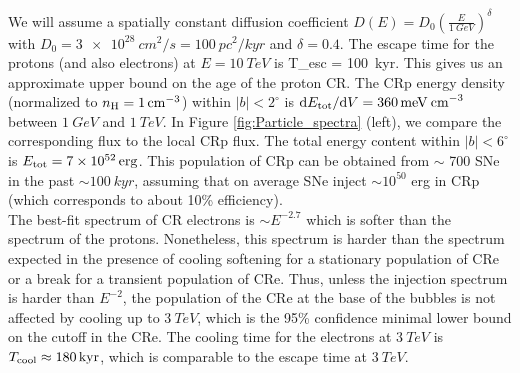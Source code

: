 We will assume a spatially constant diffusion coefficient $D(E) = D_0\left(\frac{E}{\SI{1}{GeV}}\right)^\delta$ with $D_0 = \SI{3e28}{cm^2/s} = \SI{100}{pc^2/kyr}$ and $\delta = 0.4$.
The escape time for the protons (and also electrons) at $E = \SI{10}{TeV}$ is 
\be
T_{\rm esc} =  \approx \SI{100}{kyr}.
\ee
This gives us an approximate upper bound on the age of the proton CR.
The CRp energy density (normalized to $n_{\text{H}} = \SI{1}{cm^{-3}}$) within $|b| < 2^\circ$ is 
$\text{d} E_{\text{tot}} / \text{d} V = \SI{360}{meV\: cm^{-3}}$ between $\SI{1}{GeV}$ and $\SI{1}{TeV}$.
In Figure \ref{fig:Particle_spectra} (left), we compare the corresponding flux to the local CRp flux.
The total energy content within $|b| < 6^\circ$ is $E_{\text{tot}} = \SI{7e52}{erg}$.
This population of CRp can be obtained from $\sim$ 700 SNe in the past $\sim \SI{100}{kyr}$, 
assuming that on average SNe inject $\sim 10^{50}$ erg in CRp (which corresponds to about 10\% efficiency).
\\


The best-fit spectrum of CR electrons is $\sim E^{-2.7}$ which is softer than the spectrum of the protons.
Nonetheless, this spectrum is harder than the spectrum expected in the presence of cooling softening
for a stationary population of CRe or a break for a transient population of CRe.
Thus, unless the injection spectrum is harder than $E^{-2}$, the population of the CRe at the base of the 
bubbles is not affected by cooling up to $\SI{3}{TeV}$,
which is the 95\% confidence minimal lower bound on the cutoff in the CRe. 
The cooling time for the electrons at %
$\SI{3}{TeV}$ is $T_{\rm cool} \approx \SI{180}{kyr}$,
which is comparable to the escape time at $\SI{3}{TeV}$.

